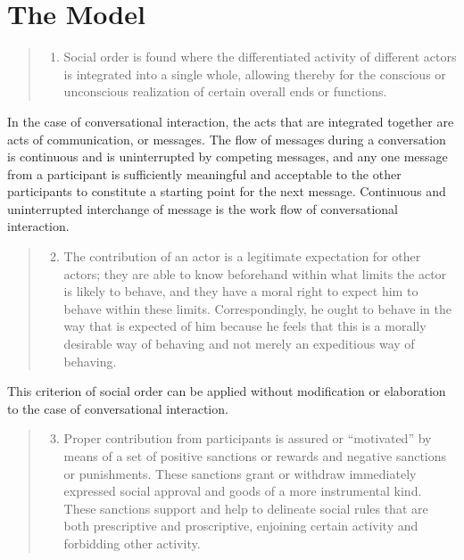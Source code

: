 \documentclass[twoside,symmetric,nobib,justified]{tufte-book}
\begin{document}
\vspace{0.25in}

\hypertarget{the-model}{%
\section{The Model}\label{the-model}}

\begin{quote}
\begin{enumerate}
\item
  Social order is found where the differentiated activity of different
  actors is integrated into a single whole, allowing thereby for the
  conscious or unconscious realization of certain overall ends or
  functions.
\end{enumerate}
\end{quote}

\noindent In the case of conversational interaction, the acts that are integrated
together are acts of communication, or messages. The flow of messages
during a conversation is continuous and is uninterrupted by competing
messages, and any one message from a participant is sufficiently
meaningful and acceptable to the other participants to constitute a
starting point for the next message. Continuous and uninterrupted
interchange of message is the work flow of conversational interaction.

\begin{quote}
\begin{enumerate}
\setcounter{enumi}{1}
\item
  The contribution of an actor is a legitimate expectation for other
  actors; they are able to know beforehand within what limits the actor
  is likely to behave, and they have a moral right to expect him to
  behave within these limits. Correspondingly, he ought to behave in the
  way that is expected of him because he feels that this is a morally
  desirable way of behaving and not merely an expeditious way of
  behaving.
\end{enumerate}
\end{quote}

\noindent This criterion of social order can be applied without modification or
elaboration to the case of conversational interaction.

\begin{quote}
\begin{enumerate}
\setcounter{enumi}{2}
\item
  Proper contribution from participants is assured or ``motivated'' by
  means of a set of positive sanctions or rewards and negative sanctions
  or punishments. These sanctions grant or withdraw immediately
  expressed social approval and goods of a more instrumental kind. These
  sanctions support and help to delineate social rules that are both
  prescriptive and proscriptive, enjoining certain activity and
  forbidding other activity.
\end{enumerate}
\end{quote}
\end{document}
